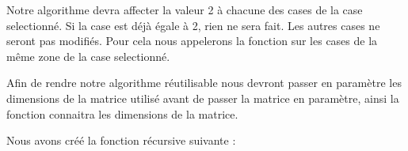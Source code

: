 Notre algorithme devra affecter la valeur 2 à chacune des cases de la case selectionné.
Si la case est déjà égale à 2, rien ne sera fait.
Les autres cases ne seront pas modifiés.
Pour cela nous appelerons la fonction sur les cases de la même zone de la case selectionné.

Afin de rendre notre algorithme réutilisable nous devront passer en paramètre les dimensions de la matrice utilisé avant de passer la matrice en paramètre, ainsi la fonction connaitra les dimensions de la matrice.

Nous avons créé la fonction récursive suivante :

\inputminted[linenos,firstline=8, lastline=25]{cpp}{../sources/cpp/TP1-2/bubbleBreaker.c}
